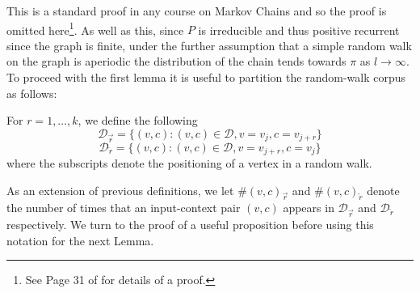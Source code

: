 \documentclass[a4paper]{article}
\newcommand{\D}{\mathcal D}
\newcommand{\rar}{\overrightarrow r}
\newcommand{\lar}{\overleftarrow r}
\begin{document}
This is a standard proof in any course on Markov Chains and so the proof is
omitted here\footnote{See Page 31 of \cite{markov_chains} for details of a proof.}. As
well as this, since $P$ is irreducible and thus positive recurrent since the
graph is finite, under the further assumption that a simple random walk on the
graph is aperiodic the distribution of the chain tends towards $\pi$ as
$l \to \infty$.\\
To proceed with the first lemma it is useful to partition the random-walk corpus as follows:
\begin{definition}
  For $r = 1, \dots, k$, we define the following
  \[\D_{\rar} = \{ (v, c) : (v, c) \in \D, v = v_j, c = v_{j+r}\}\]
  \[\D_{\lar} = \{ (v, c) : (v, c) \in \D, v = v_{j+r}, c = v_{j}\}\]
  where the subscripts denote the positioning of a vertex in a random walk.
\end{definition}
As an extension of previous definitions, we let $\#(v, c)_{\rar}$ and $\#(v,
c)_{\lar}$ denote the number of times that an input-context pair $(v,c)$ appears
in $\D_{\rar}$ and $\D_{\lar}$ respectively. We turn to the proof of a useful proposition before using this
notation for the next Lemma.
\end{document}
